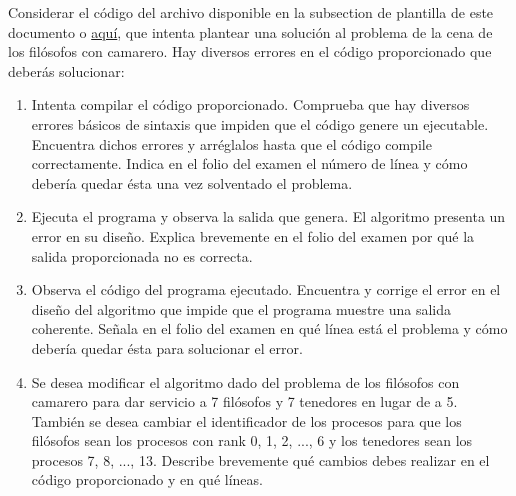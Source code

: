 \documentclass[a4paper,12pt]{article}
\begin{document}
Considerar el código del archivo disponible en la subsection de plantilla de este documento o \href{https://github.com/ElblogdeIsmael/ElblogdeIsmael.github.io/blob/main/Asignaturas/Tercer%20A%C3%B1o/SCD/Examenes/SegundoParcial/ETSIIT/code/plantilla.cpp}{aquí}, que intenta plantear una solución al problema de la cena de los filósofos con camarero. Hay diversos errores en el código proporcionado que deberás solucionar:
\begin{enumerate}
    \item Intenta compilar el código proporcionado. Comprueba que hay diversos errores básicos de sintaxis que impiden que el código genere un ejecutable. Encuentra dichos errores y arréglalos hasta que el código compile correctamente. Indica en el folio del examen el número de línea y cómo debería quedar ésta una vez solventado el problema.
    \item Ejecuta el programa y observa la salida que genera. El algoritmo presenta un error en su diseño. Explica brevemente en el folio del examen por qué la salida proporcionada no es correcta.
    \item Observa el código del programa ejecutado. Encuentra y corrige el error en el diseño del algoritmo que impide que el programa muestre una salida coherente. Señala en el folio del examen en qué línea está el problema y cómo debería quedar ésta para solucionar el error.
    \item Se desea modificar el algoritmo dado del problema de los filósofos con camarero para dar servicio a 7 filósofos y 7 tenedores en lugar de a 5. También se desea cambiar el identificador de los procesos para que los filósofos sean los procesos con rank 0, 1, 2, ..., 6 y los tenedores sean los procesos 7, 8, ..., 13. Describe brevemente qué cambios debes realizar en el código proporcionado y en qué líneas.
\end{enumerate}


\end{document}
